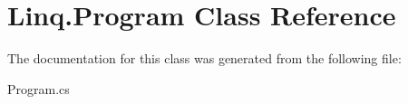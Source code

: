 \hypertarget{class_linq_1_1_program}{}\section{Linq.\+Program Class Reference}
\label{class_linq_1_1_program}


The documentation for this class was generated from the following file\+:\begin{DoxyCompactItemize}
\item 
Program.\+cs\end{DoxyCompactItemize}
